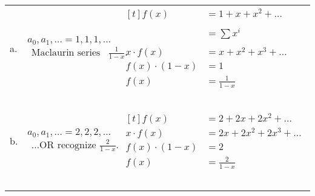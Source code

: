 \documentclass[11pt,twosided]{article}
\begin{document}
\begin{longtable}{p{0.2in}p{2.2in}p{3.6in}}
    a.  &   $a_0, a_1, \dots = 1, 1, 1, \dots$ \begin{multline*} \text{Maclaurin series for $\frac{1}{1-x}.$} \end{multline*} &
        $\begin{aligned}[t]
            f(x)    &=  1 + x + x^2 + \dots \\ \\
            &= \sum x^i \\ \\
            x \cdot f(x)  &=  x + x^2 + x^3 + \dots \\
            f(x) \cdot (1-x) &= 1 \\
            f(x)    &=  \frac{1}{1-x}
        \end{aligned}$ \\~\\
    b.  &   $a_0, a_1, \dots = 2, 2, 2, \dots$ \begin{multline*} \text{...OR recognize $\frac{2}{1-x}$.}\end{multline*}&
        $\begin{aligned}[t]
            f(x)    &=  2 + 2x + 2x^2 + \dots \\
            x \cdot f(x)  &=  2x + 2x^2 + 2x^3 + \dots \\
            f(x) \cdot (1-x) &= 2 \\
            f(x)    &=  \frac{2}{1-x}
        \end{aligned}$ \\~\\
        

\end{longtable}
\end{document}
